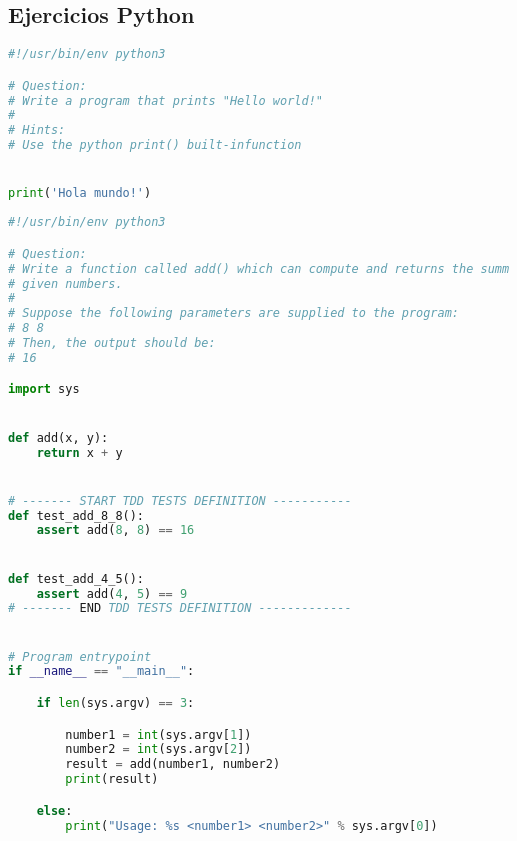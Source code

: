 \subsection{Ejercicios Python}
\begin{lstlisting}[language=python,caption={exercise\_1.py},captionpos=b]
#!/usr/bin/env python3

# Question:
# Write a program that prints "Hello world!"
#
# Hints:
# Use the python print() built-infunction


print('Hola mundo!')
\end{lstlisting}

\begin{lstlisting}[language=python,caption={exercise\_2.py},captionpos=b]
#!/usr/bin/env python3

# Question:
# Write a function called add() which can compute and returns the summ of two
# given numbers.
#
# Suppose the following parameters are supplied to the program:
# 8 8
# Then, the output should be:
# 16

import sys


def add(x, y):
    return x + y


# ------- START TDD TESTS DEFINITION -----------
def test_add_8_8():
    assert add(8, 8) == 16


def test_add_4_5():
    assert add(4, 5) == 9
# ------- END TDD TESTS DEFINITION -------------


# Program entrypoint
if __name__ == "__main__":

    if len(sys.argv) == 3:

        number1 = int(sys.argv[1])
        number2 = int(sys.argv[2])
        result = add(number1, number2)
        print(result)

    else:
        print("Usage: %s <number1> <number2>" % sys.argv[0])
\end{lstlisting}

